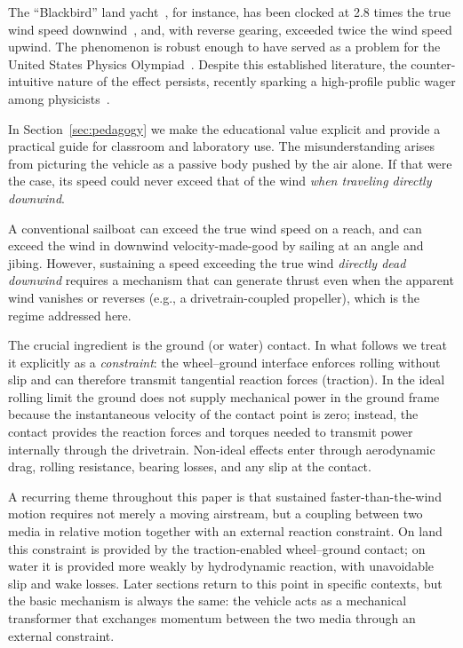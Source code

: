 \documentclass[reprint,aps,pra,longbibliography]{revtex4-2}
\begin{document}
The ``Blackbird'' land yacht~\cite{nahon-2023}, for instance, has been clocked at 2.8 times the true wind speed downwind~\cite{nalsa2010}, and, with reverse gearing, exceeded twice the wind speed upwind. The phenomenon is robust enough to have served as a problem for the United States Physics Olympiad~\cite{AAPT2013}. Despite this established literature, the counter-intuitive nature of the effect persists, recently sparking a high-profile public wager among physicists~\cite{Veritasium2021}.

In Section~\ref{sec:pedagogy} we make the educational value explicit and provide a practical guide for classroom and laboratory use.
The misunderstanding arises from picturing the vehicle as a passive body pushed by the air alone. If that were the case, its speed could never exceed that of the wind \emph{when traveling directly downwind}.

A conventional sailboat can exceed the true wind speed on a reach, and can exceed the wind in downwind velocity-made-good by sailing at an angle and jibing. However, sustaining a speed exceeding the true wind \emph{directly dead downwind} requires a mechanism that can generate thrust even when the apparent wind vanishes or reverses (e.g., a drivetrain-coupled propeller), which is the regime addressed here.

The crucial ingredient is the ground (or water) contact. In what follows we treat it explicitly as a \emph{constraint}: the wheel--ground interface enforces rolling without slip and can therefore transmit tangential reaction forces (traction). In the ideal rolling limit the ground does not supply mechanical power in the ground frame because the instantaneous velocity of the contact point is zero; instead, the contact provides the reaction forces and torques needed to transmit power internally through the drivetrain. Non-ideal effects enter through aerodynamic drag, rolling resistance, bearing losses, and any slip at the contact.

A recurring theme throughout this paper is that sustained faster-than-the-wind
motion requires not merely a moving airstream, but a coupling between two media
in relative motion together with an external reaction constraint. On land this
constraint is provided by the traction-enabled wheel--ground contact; on water
it is provided more weakly by hydrodynamic reaction, with unavoidable slip and
wake losses. Later sections return to this point in specific contexts, but the
basic mechanism is always the same: the vehicle acts as a mechanical
transformer that exchanges momentum between the two media through an external
constraint.
\end{document}
